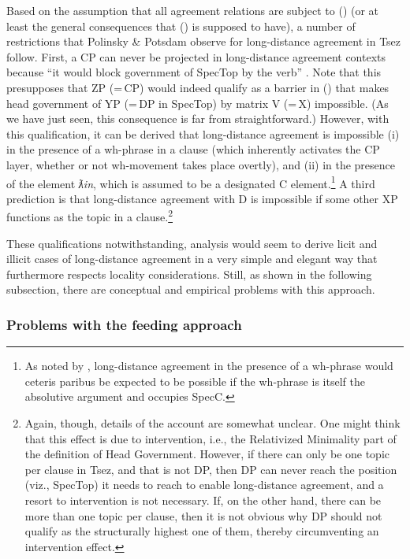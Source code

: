 \documentclass[output=paper
,modfonts
,nonflat]{langsci/langscibook}
\begin{document}
	Based on the assumption that all agreement relations are subject to
	(\LLast) (or at least the general consequences that (\LLast) is supposed
	to have), a number of restrictions that Polinsky \& Potsdam observe for
	long-distance agreement in Tsez follow. First, a CP can never be
	projected in long-distance agreement contexts because ``it would block
	government of SpecTop by the verb''
	\citep[638]{PolinskyPotsdam:01}. Note  that this presupposes that
	ZP (=\,CP) would indeed qualify as a barrier in (\Last) that makes
	head government of YP (=\,DP in SpecTop) by matrix V (=\,X)
	impossible. (As we have just seen, this consequence is far from
	straightforward.) However, with this qualification, it can be derived
	that long-distance agreement is impossible (i) in the presence of a
	wh-phrase in a clause (which inherently activates the CP layer,
	whether or not wh-movement takes place overtly), and (ii) in the
	presence of the element {\itshape ƛin}, which is assumed to be
	a designated C element.\footnote{\label{whabs}As noted by
		\citet[fn. 20]{PolinskyPotsdam:01}, long-distance agreement in the
		presence of a 
		wh-phrase would ceteris paribus be expected to be possible if the
		wh-phrase is itself the absolutive argument and occupies SpecC.}
	A third prediction is that long-distance
	agreement with D is impossible if some other XP functions as
	the topic in a clause.\footnote{Again, though, details of the account
		are somewhat unclear. One might think that this effect is due to
		intervention, i.e., the Relativized Minimality part of the
		definition of Head Government. However,  if there can only be one topic per clause in
		Tsez, and that is not DP, then DP can never reach the
		position (viz., SpecTop) it needs to reach to enable long-distance
		agreement, and a resort to intervention is not necessary. If, on the other hand, there can be more than one topic
		per clause, then it is not obvious why DP should not qualify
		as the structurally highest one of them, thereby circumventing an
		intervention effect.}
	
	These qualifications notwithstanding, 
	analysis would seem to derive licit and illicit cases of long-distance
	agreement in a very simple and elegant way that furthermore respects
	locality considerations. Still, as shown in the following subsection,
	there are conceptual and empirical problems with this approach.
	
	
	\subsubsection{Problems with the feeding approach}	
	
\end{document}
